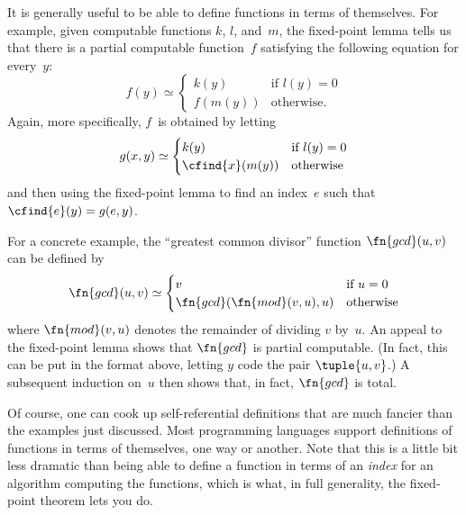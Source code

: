 \documentclass[../../../include/open-logic-section]{subfiles}
\begin{document}

It is generally useful to be able to define functions in terms of
themselves. For example, given computable functions $k$, $l$, and~$m$,
the fixed-point lemma tells us that there is a partial computable
function~$f$ satisfying the following equation for every~$y$:
\[
f(y) \simeq
\begin{cases}
k(y) & \text{if $l(y) = 0$} \\
f(m(y)) & \text{otherwise.}
\end{cases}
\]
Again, more specifically, $f$~is obtained by letting
\[
g(x,y) \simeq
\begin{cases}
k(y) & \text{if $l(y) = 0$} \\
\cfind{x}(m(y)) & \text{otherwise}
\end{cases}
\]
and then using the fixed-point lemma to find an index~$e$ such that
$\cfind{e}(y) = g(e,y)$.

For a concrete example, the ``greatest common divisor'' function
$\fn{gcd}(u,v)$ can be defined by
\[
\fn{gcd}(u,v) \simeq
\begin{cases}
v & \text{if $u = 0$} \\
\fn{gcd}(\fn{mod}(v, u), u) & \text{otherwise}
\end{cases}
\]
where $\fn{mod}(v, u)$ denotes the remainder of dividing $v$
by~$u$. An appeal to the fixed-point lemma shows that $\fn{gcd}$ is
partial computable. (In fact, this can be put in the format above,
letting $y$ code the pair $\tuple{u, v}$.) A subsequent induction
on~$u$ then shows that, in fact, $\fn{gcd}$ is total.

Of course, one can cook up self-referential definitions that are much
fancier than the examples just discussed. Most programming languages
support definitions of functions in terms of themselves, one way or
another. Note that this is a little bit less dramatic than being able
to define a function in terms of an \emph{index} for an algorithm
computing the functions, which is what, in full generality, the
fixed-point theorem lets you do.
\end{document}

